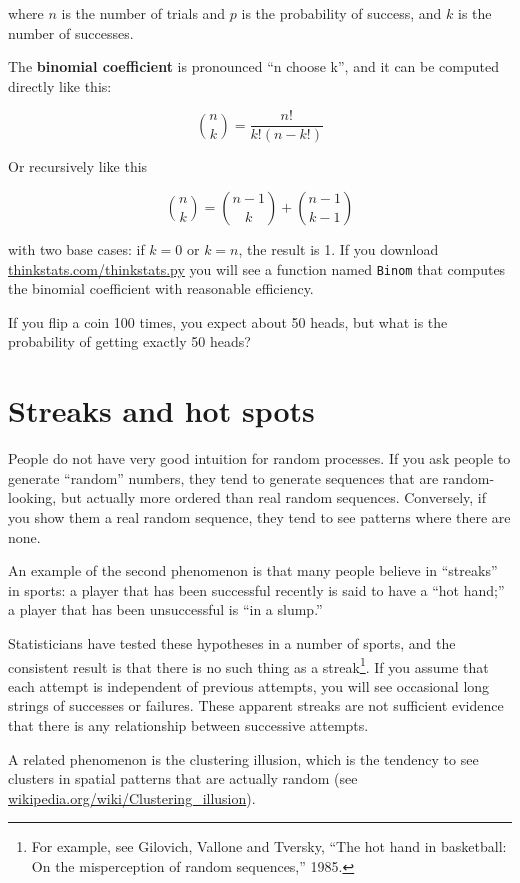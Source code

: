 \documentclass[12pt]{book}
\begin{document}
where $n$ is the number of trials and $p$ is the probability of success,
and $k$ is the number of successes.

The {\bf binomial coefficient} is pronounced ``n choose k'', and it
can be computed directly like this:

\[ \binom{n}{k} = \frac{n!}{k!(n-k!)}  \]

Or recursively like this

\[ \binom{n}{k} = \binom{n-1}{k} + \binom{n-1}{k-1} \]

with two base cases: if $k=0$ or $k=n$, the result is 1.  If you
download \url{thinkstats.com/thinkstats.py} you will see a function
named {\tt Binom} that computes the binomial coefficient with reasonable
efficiency.

\begin{ex}
If you flip a coin 100 times, you expect about 50 heads, but what
is the probability of getting exactly 50 heads?


\end{ex}

\section{Streaks and hot spots}

People do not have very good intuition for random processes.  If you
ask people to generate ``random'' numbers, they tend to generate
sequences that are random-looking, but actually more ordered than real
random sequences.  Conversely, if you show them a real random
sequence, they tend to see patterns where there are none.

An example of the second phenomenon is that many people believe
in ``streaks'' in sports: a player that has been successful recently
is said to have a ``hot hand;'' a player that has been unsuccessful is
``in a slump.''

Statisticians have tested these hypotheses in a number of sports, and
the consistent result is that there is no such thing as a
streak\footnote{For example, see Gilovich, Vallone and Tversky, ``The
  hot hand in basketball: On the misperception of random sequences,''
  1985.}.  If you assume that each attempt is independent of previous
attempts, you will see occasional long strings of successes or
failures.  These apparent streaks are not sufficient evidence that
there is any relationship between successive attempts.

A related phenomenon is the clustering illusion, which is the
tendency to see clusters in spatial patterns that are actually
random (see \url{wikipedia.org/wiki/Clustering_illusion}).
\end{document}
